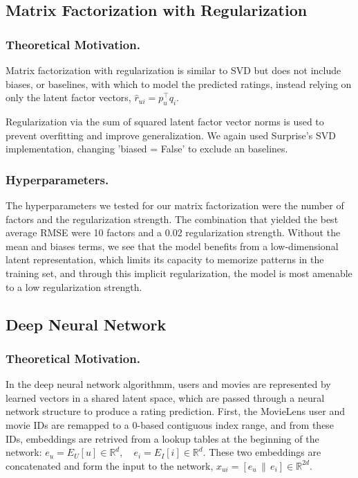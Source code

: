 \subsection{Matrix Factorization with Regularization}

\subsubsection{Theoretical Motivation.}

Matrix factorization with regularization is similar to SVD but does not include biases, or baselines, with which to model the predicted ratings, 
instead relying on only the latent factor vectors, $ \hat{r}_{ui} = p_u^\top q_i $.

Regularization via the sum of squared latent factor vector norms is used to prevent overfitting and improve generalization. We again used Surprise's SVD implementation, changing 'biased = False' to exclude an baselines. 

\subsubsection{Hyperparameters.}

The hyperparameters we tested for our matrix factorization were the number of factors and the regularization strength. The combination that yielded the best average RMSE were 10 factors and a 0.02 regularization strength. Without the mean and biases terms, we see that
the model benefits from a low-dimensional latent representation, which limits its capacity to memorize patterns in the training set, and through this implicit regularization, the model is most amenable to a low regularization strength.


\subsection{Deep Neural Network}

\subsubsection{Theoretical Motivation.}

In the deep neural network algorithmm, users and movies are represented by learned vectors in a shared latent space, 
which are passed through a neural network structure to produce a rating prediction. First, the MovieLens user and movie IDs are remapped to a 0-based contiguous index range, and from these IDs, embeddings are retrived from a lookup tables at the beginning of 
the network: $ e_u = E_U[u] \in \mathbb{R}^d, \quad e_i = E_I[i] \in \mathbb{R}^d $. These two embeddings are concatenated and form the input to the network, $ x_{ui} = [e_u \,\|\, e_i] \in \mathbb{R}^{2d} $.

